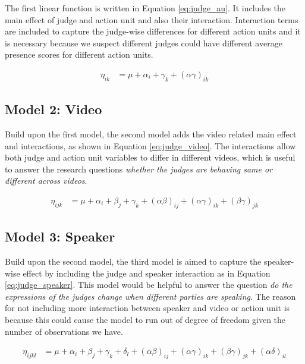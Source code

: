 \documentclass{monashthesis}
\begin{document}
The first linear function is written in Equation \ref{eq:judge_au}. It includes the main effect of judge and action unit and also their interaction. Interaction terms are included to capture the judge-wise differences for different action units and it is necessary because we suspect different judges could have different average presence scores for different action units.

\begin{align}\label{eq:judge_au}
\eta_{ik} &= \mu + \alpha_i + \gamma_k + (\alpha\gamma)_{ik}
\end{align}

\hypertarget{model-2-video}{%
\subsection{Model 2: Video}\label{model-2-video}}

Build upon the first model, the second model adds the video related main effect and interactions, as shown in Equation \ref{eq:judge_video}. The interactions allow both judge and action unit variables to differ in different videos, which is useful to answer the research questions \emph{whether the judges are behaving same or different across videos}.

\begin{align}\label{eq:judge_video}
\eta_{ijk} &= \mu + \alpha_i + \beta_j +\gamma_k + (\alpha\beta)_{ij} + (\alpha\gamma)_{ik} + (\beta\gamma)_{jk}
\end{align}

\noindent 

\hypertarget{model-3-speaker}{%
\subsection{Model 3: Speaker}\label{model-3-speaker}}

Build upon the second model, the third model is aimed to capture the speaker-wise effect by including the judge and speaker interaction as in Equation \ref{eq:judge_speaker}. This model would be helpful to answer the question \emph{do the expressions of the judges change when different parties are speaking}. The reason for not including more interaction between speaker and video or action unit is because this could cause the model to run out of degree of freedom given the number of observations we have.

\begin{align}\label{eq:judge_speaker}
\eta_{ijkl} &= \mu + \alpha_i + \beta_j +\gamma_k + \delta_l + (\alpha\beta)_{ij} + (\alpha\gamma)_{ik} + (\beta\gamma)_{jk} + (\alpha\delta)_{il}
\end{align}
\end{document}
